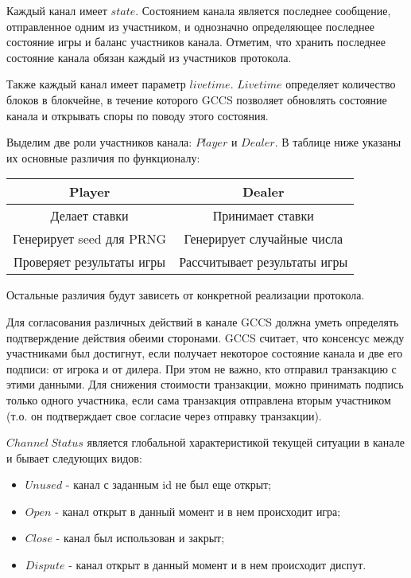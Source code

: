Каждый канал имеет $state$. Состоянием канала является последнее сообщение, отправленное одним из участником, и однозначно определяющее последнее состояние игры и баланс участников канала. Отметим, что хранить последнее состояние канала обязан каждый из участников протокола. 

Также каждый канал имеет параметр $livetime$. $Livetime$ определяет количество блоков в блокчейне, в течение которого GCCS позволяет обновлять состояние канала и открывать споры по поводу этого состояния. 

Выделим две роли участников канала: $ Player $ и $Dealer$. В таблице ниже указаны их основные различия по функционалу:
\begin{center}
\begin{tabular}{ |c|c| } 
 \hline
 \textbf{Player} & \textbf{Dealer} \\ 
 \hline
 Делает ставки & Принимает ставки \\ 
 Генерирует seed для PRNG & Генерирует случайные числа \\ 
 Проверяет результаты игры & Рассчитывает результаты игры\\
 \hline
\end{tabular}
\end{center}
Остальные различия будут зависеть от конкретной реализации протокола. 


Для согласования различных действий в канале GCCS должна уметь определять подтверждение действия обеими сторонами. GCCS считает, что консенсус между участниками был достигнут, если получает некоторое состояние канала и две его подписи: от игрока и от дилера. При этом не важно, кто отправил транзакцию с этими данными. Для снижения стоимости транзакции, можно принимать подпись только одного участника, если сама транзакция отправлена вторым участником (т.о. он подтверждает свое согласие через отправку транзакции). 

$Channel \ Status$ является глобальной характеристикой текущей ситуации в канале и бывает следующих видов:
\begin{itemize}
	\item $Unused$ - канал с заданным id не был еще открыт;
	\item $Open$ - канал открыт в данный момент и в нем происходит игра;
	\item $Close$ - канал был использован и закрыт;
	\item $Dispute$ - канал открыт в данный момент и в нем происходит диспут.
\end{itemize}

